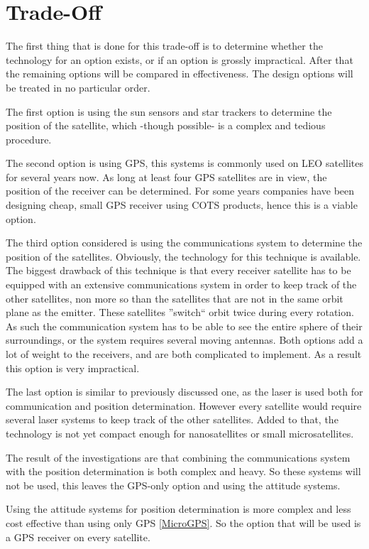 \documentclass[11pt]{report}
\begin{document}
\section{Trade-Off}
\label{navi2}
The first thing that is done for this trade-off is to determine whether the technology for an option exists, or if an option is grossly impractical. After that the remaining options will be compared in effectiveness. The design options will be treated in no particular order.

The first option is using the sun sensors and star trackers to determine the position of the satellite, which -though possible- is a complex and tedious procedure.

The second option is using \acs{GPS}, this systems is commonly used on \acs{LEO} satellites for several years now. As long at least four \acs{GPS} satellites are in view, the position of the receiver can be determined. For some years companies have been designing cheap, small GPS receiver using \acs{COTS} products, hence this is a viable option.

The third option considered is using the communications system to determine the position of the satellites. Obviously, the technology for this technique is available. The biggest drawback of this technique is that every receiver satellite has to be equipped with an extensive communications system in order to keep track of the other satellites, non more so than the satellites that are not in the same orbit plane as the emitter. These satellites ''switch`` orbit twice during every rotation. As such the communication system has to be able to see the entire sphere of their surroundings, or the system requires several moving antennas. Both options add a lot of weight to the receivers, and are both complicated to implement. As a result this option is very impractical.

The last option is similar to previously discussed one, as the laser is used both for communication and position determination. However every satellite would require several laser systems to keep track of the other satellites. Added to that, the technology is not yet compact enough for nanosatellites or small microsatellites.

The result of the investigations are that combining the communications system with the position determination is both complex and heavy. So these systems will not be used, this leaves the \acs{GPS}-only option and using the attitude systems.

Using the attitude systems for position determination is more complex and less cost effective than using only \acs{GPS} \ref{MicroGPS}. So the option that will be used is a \acs{GPS} receiver on every satellite.
\end{document}
